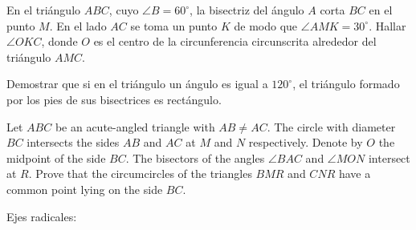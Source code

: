 \begin{problema}
En el tri\'angulo $ABC$, cuyo $\angle B=60^\circ$, la bisectriz del \'angulo $A$
corta $BC$ en el punto $M$. En el lado $AC$ se toma un punto $K$ de modo que
$\angle AMK=30^\circ$. Hallar $\angle OKC$, donde $O$ es el centro de la circunferencia
circunscrita alrededor del tri\'angulo $AMC$.


\end{problema}

\begin{problema}
Demostrar que si en el tri\'angulo un \'angulo es igual a $120^\circ$, el
tri\'angulo formado por los pies de sus bisectrices es rect\'angulo.


\end{problema}


\newpage 

\begin{problema}
Let $ABC$ be an acute-angled triangle with $AB\neq AC$. The circle with diameter $BC$ intersects the sides $AB$ and $AC$ at $M$ and $N$ respectively. Denote by $O$ the midpoint of the side $BC$. The bisectors of the angles $\angle BAC$ and $\angle MON$ intersect at $R$. Prove that the circumcircles of the triangles $BMR$ and $CNR$ have a common point lying on the side $BC$.
\end{problema}


Ejes radicales:

